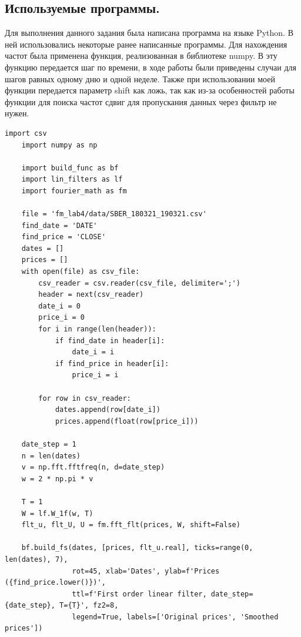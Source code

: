 \documentclass[a4paper, 12pt]{article}
\begin{document}
    \subsection{Используемые программы.}
    Для выполнения данного задания была написана программа на языке Python. В ней использовались
    некоторые ранее написанные программы. Для нахождения частот была применена функция, реализованная
    в библиотеке numpy. В эту функцию передается шаг по времени, в ходе работы были приведены случаи для
    шагов равных одному дню и одной неделе. Также при использовании моей функции передается параметр shift
    как ложь, так как из-за особенностей работы функции для поиска частот сдвиг для пропускания данных
    через фильтр не нужен.
    \begin{lstlisting}[label=task3, caption={Программа для сглаживания биржевых данных.}]
    import csv
    import numpy as np

    import build_func as bf
    import lin_filters as lf
    import fourier_math as fm

    file = 'fm_lab4/data/SBER_180321_190321.csv'
    find_date = 'DATE'
    find_price = 'CLOSE'
    dates = []
    prices = []
    with open(file) as csv_file:
        csv_reader = csv.reader(csv_file, delimiter=';')
        header = next(csv_reader)
        date_i = 0
        price_i = 0
        for i in range(len(header)):
            if find_date in header[i]:
                date_i = i
            if find_price in header[i]:
                price_i = i

        for row in csv_reader:
            dates.append(row[date_i])
            prices.append(float(row[price_i]))

    date_step = 1
    n = len(dates)
    v = np.fft.fftfreq(n, d=date_step)
    w = 2 * np.pi * v

    T = 1
    W = lf.W_1f(w, T)
    flt_u, flt_U, U = fm.fft_flt(prices, W, shift=False)

    bf.build_fs(dates, [prices, flt_u.real], ticks=range(0, len(dates), 7),
                rot=45, xlab='Dates', ylab=f'Prices ({find_price.lower()})',
                ttl=f'First order linear filter, date_step={date_step}, T={T}', fz2=8,
                legend=True, labels=['Original prices', 'Smoothed prices'])
    \end{lstlisting}
\end{document}
